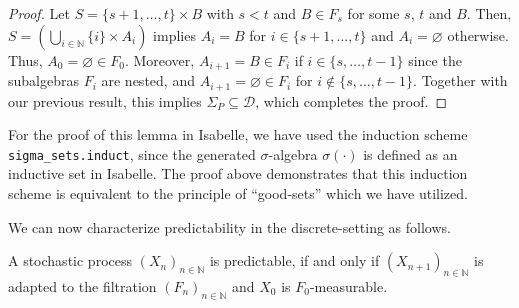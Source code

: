 \begin{proof}
	Let $S = \{s + 1,\dots,t\} \times B$ with $s < t$ and $B \in F_s$ for some $s$, $t$ and $B$. Then, $S = (\bigcup_{i \in \mathbb{N}} \{i\} \times A_i)$ implies $A_i = B$ for $i \in \{s + 1,\dots,t\}$ and $A_i = \varnothing$ otherwise. Thus, $A_0 = \varnothing \in F_0$. Moreover, $A_{i + 1} = B \in F_i$ if $i \in \{s,\dots,t - 1\}$ since the subalgebras $F_i$ are nested, and $A_{i + 1} = \varnothing \in F_i$ for $i \notin \{s,\dots,t - 1\}$. Together with our previous result, this implies $\Sigma_P \subseteq \mathcal{D}$, which completes the proof.
\end{proof}

\begin{remark}
	For the proof of this lemma in Isabelle, we have used the induction scheme \texttt{sigma\_sets.induct}, since the generated $\sigma$-algebra $\sigma(\cdot)$ is defined as an inductive set in Isabelle. The proof above demonstrates that this induction scheme is equivalent to the principle of ``good-sets'' which we have utilized.
\end{remark}

We can now characterize predictability in the discrete-setting as follows.

\begin{theorem}
	A stochastic process $(X_n)_{n \in \mathbb{N}}$ is predictable, if and only if $(X_{n + 1})_{n \in \mathbb{N}}$ is adapted to the filtration $(F_n)_{n \in \mathbb{N}}$ and $X_0$ is $F_0$-measurable.
\end{theorem}

